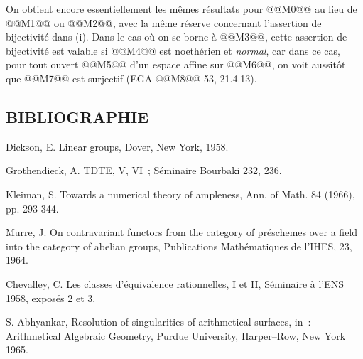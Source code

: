 
On
obtient encore essentiellement les mêmes résultats pour @@M0@@ au lieu de @@M1@@ ou @@M2@@, avec la même réserve concernant l'assertion de bijectivité dans (i). Dans le cas où on se borne à @@M3@@, cette assertion de bijectivité est valable si @@M4@@ est noethérien et \emph{normal}, car dans ce cas, pour tout ouvert @@M5@@ d'un espace affine sur @@M6@@, on voit aussitôt que @@M7@@ est surjectif (EGA @@M8@@ 53, 21.4.13).

\subsection*{BIBLIOGRAPHIE}
\begin{enumerate}[label={[\arabic*]}]
\item Dickson, E. Linear groups, Dover, New York, 1958.
\item Grothendieck, A. TDTE, V, VI~; Séminaire Bourbaki 232, 236.
\item Kleiman, S. Towards a numerical theory of ampleness, Ann. of Math. 84 (1966), pp. 293-344.
\item Murre, J. On contravariant functors from the category of préschemes over a field into the category of abelian groups, Publications Mathématiques de l'IHES, 23, 1964.
\item Chevalley, C. Les classes d'équivalence rationnelles, I et II, Séminaire à l'ENS 1958, exposés 2 et 3.
\item S. Abhyankar, Resolution of singularities of arithmetical surfaces, in~: Arithmetical Algebraic Geometry, Purdue University, Harper--Row, New York 1965.
\end{enumerate}

\providecommand{\Isom}{\operatorname{Isom}}
\providecommand{\Hom}{\operatorname{Hom}}
\providecommand{\Coker}{\operatorname{Coker}}
\providecommand{\Nil}{\operatorname{Nil}}
\providecommand{\im}{\operatorname{Im}}
\providecommand{\coker}{\operatorname{coker}}
\providecommand{\Supp}{\operatorname{Supp}}
\providecommand{\fppf}{\mathrm{fppf}}
\providecommand{\zar}{\mathrm{zar}}
\providecommand{\GL}{\operatorname{Gl}}
\providecommand{\Gr}{\operatorname{Gr}}
\providecommand{\Pic}{\operatorname{Pic}}
\providecommand{\Spec}{\operatorname{Spec}}
\providecommand{\V}{\operatorname{V}}
\providecommand{\Ass}{\operatorname{Ass}}

\newpage
